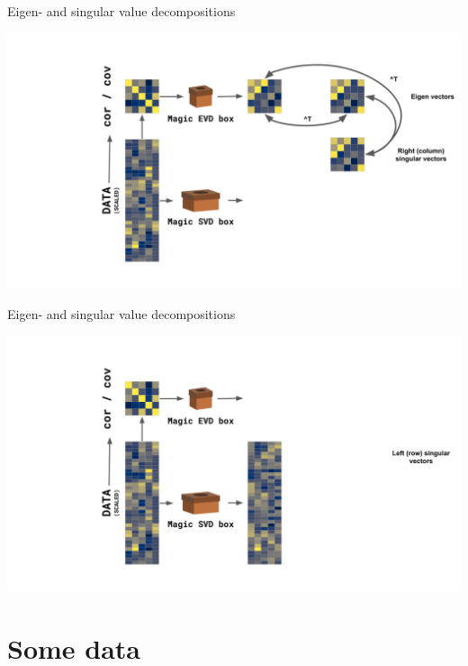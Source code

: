 \documentclass[
  ignorenonframetext,
]{beamer}
\begin{document}
\begin{frame}{Eigen- and singular value decompositions}
\protect\hypertarget{eigen--and-singular-value-decompositions-3}{}

\includegraphics{../images/EVD_SVD_4.png}

\end{frame}

\begin{frame}{Eigen- and singular value decompositions}
\protect\hypertarget{eigen--and-singular-value-decompositions-4}{}

\includegraphics{../images/EVD_SVD_5.png}

\end{frame}

\hypertarget{some-data}{%
\section{Some data}\label{some-data}}
\end{document}
